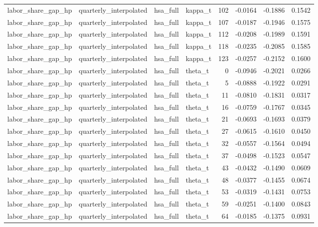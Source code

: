 \begin{tabular}{llllrrrr}
labor\_share\_gap\_hp & quarterly\_interpolated & hsa\_full & kappa\_t & 102 & -0.0164 & -0.1886 & 0.1542 \\
labor\_share\_gap\_hp & quarterly\_interpolated & hsa\_full & kappa\_t & 107 & -0.0187 & -0.1946 & 0.1575 \\
labor\_share\_gap\_hp & quarterly\_interpolated & hsa\_full & kappa\_t & 112 & -0.0208 & -0.1989 & 0.1591 \\
labor\_share\_gap\_hp & quarterly\_interpolated & hsa\_full & kappa\_t & 118 & -0.0235 & -0.2085 & 0.1585 \\
labor\_share\_gap\_hp & quarterly\_interpolated & hsa\_full & kappa\_t & 123 & -0.0257 & -0.2152 & 0.1600 \\
labor\_share\_gap\_hp & quarterly\_interpolated & hsa\_full & theta\_t & 0 & -0.0946 & -0.2021 & 0.0266 \\
labor\_share\_gap\_hp & quarterly\_interpolated & hsa\_full & theta\_t & 5 & -0.0888 & -0.1922 & 0.0291 \\
labor\_share\_gap\_hp & quarterly\_interpolated & hsa\_full & theta\_t & 11 & -0.0810 & -0.1831 & 0.0317 \\
labor\_share\_gap\_hp & quarterly\_interpolated & hsa\_full & theta\_t & 16 & -0.0759 & -0.1767 & 0.0345 \\
labor\_share\_gap\_hp & quarterly\_interpolated & hsa\_full & theta\_t & 21 & -0.0693 & -0.1693 & 0.0379 \\
labor\_share\_gap\_hp & quarterly\_interpolated & hsa\_full & theta\_t & 27 & -0.0615 & -0.1610 & 0.0450 \\
labor\_share\_gap\_hp & quarterly\_interpolated & hsa\_full & theta\_t & 32 & -0.0557 & -0.1564 & 0.0494 \\
labor\_share\_gap\_hp & quarterly\_interpolated & hsa\_full & theta\_t & 37 & -0.0498 & -0.1523 & 0.0547 \\
labor\_share\_gap\_hp & quarterly\_interpolated & hsa\_full & theta\_t & 43 & -0.0432 & -0.1490 & 0.0609 \\
labor\_share\_gap\_hp & quarterly\_interpolated & hsa\_full & theta\_t & 48 & -0.0377 & -0.1455 & 0.0674 \\
labor\_share\_gap\_hp & quarterly\_interpolated & hsa\_full & theta\_t & 53 & -0.0319 & -0.1431 & 0.0753 \\
labor\_share\_gap\_hp & quarterly\_interpolated & hsa\_full & theta\_t & 59 & -0.0251 & -0.1400 & 0.0843 \\
labor\_share\_gap\_hp & quarterly\_interpolated & hsa\_full & theta\_t & 64 & -0.0185 & -0.1375 & 0.0931 \\

\end{tabular}
